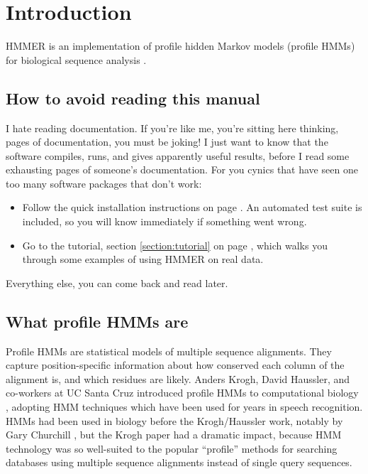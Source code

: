 \section{Introduction}

HMMER is an implementation of profile hidden Markov models (profile
HMMs) for biological sequence analysis
\cite{Krogh94,Eddy98,Durbin98}. 

\subsection{How to avoid reading this manual}

I hate reading documentation. If you're like me, you're sitting here
thinking, \pageref{manualend} pages of documentation, you must be
joking! I just want to know that the software compiles, runs, and
gives apparently useful results, before I read some 
\pageref{manualend} exhausting pages of someone's documentation. For
you cynics that have seen one too many software packages that don't
work:

\begin{itemize}
\item Follow the quick installation instructions on page
      \pageref{section:installation}. An automated test suite
      is included, so you will know immediately if something
      went wrong.
\item Go to the tutorial, section \ref{section:tutorial} on page
\pageref{section:tutorial}, which walks you through some examples of
using HMMER on real data.
\end{itemize}

Everything else, you can come back and read later.

\subsection{What profile HMMs are}

Profile HMMs are statistical models of multiple sequence alignments.
They capture position-specific information about how conserved each
column of the alignment is, and which residues are likely.  Anders
Krogh, David Haussler, and co-workers at UC Santa Cruz introduced
profile HMMs to computational biology \cite{Krogh94}, adopting HMM
techniques which have been used for years in speech recognition. HMMs
had been used in biology before the Krogh/Haussler work, notably by
Gary Churchill \cite{Churchill89}, but the Krogh paper had a dramatic
impact, because HMM technology was so well-suited to the popular
``profile'' methods for searching databases using multiple sequence
alignments instead of single query sequences. 


